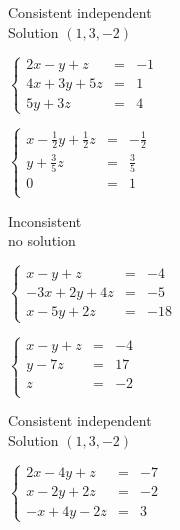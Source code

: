 \documentclass{ximera}
\begin{document}
\begin{question}
\begin{problem}
\begin{solution}
Consistent independent\\
Solution $(1,3,-2)$
\end{solution}
\end{problem}

\begin{problem}
$\left\{ \begin{array}{rcr} 2x-y+z& = & -1 \\ 4x+3y+5z & = & 1 \\  5y+3z & = & 4 \end{array} \right.$

\begin{solution}
$\left\{ \begin{array}{rcr} x - \frac{1}{2} y + \frac{1}{2} z & = & -\frac{1}{2}  \\   y + \frac{3}{5} z & = & \frac{3}{5} \\ 0 & = & 1 \\  \end{array} \right.$
 

Inconsistent\\
no solution
\end{solution}
\end{problem}

\begin{problem}
$\left\{ \begin{array}{rcr} x-y+z & = & -4 \\ -3x+2y+4z & = & -5 \\ x-5y+2z & = & -18  \end{array} \right.$

\begin{solution}
$\left\{ \begin{array}{rcr} x-y+z & = & -4  \\ y - 7z & = & 17 \\ z & = & -2 \\  \end{array} \right.$
 

Consistent independent\\
Solution $(1,3,-2)$
\end{solution}
\end{problem}

\begin{problem}
$\left\{ \begin{array}{rcr} 2x-4y+z & = & -7 \\ x-2y+2z & = & -2 \\ -x+4y-2z & = & 3  \end{array} \right.$


\end{problem}
\end{question}
\end{document}
